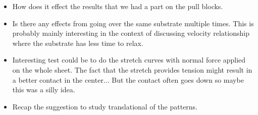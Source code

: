\begin{itemize}
  \item How does it effect the results that we had a part on the pull blocks. 
  \item Is there any effects from going over the same substrate multiple times. This is probably mainly interesting in the context of discussing velocity relationship where the substrate has less time to relax.
  \item Interesting test could be to do the stretch curves with normal force applied on the whole sheet. The fact that the stretch provides tension might result in a better contact in the center... But the contact often goes down so maybe this was a silly idea.
  \item Recap the suggestion to study translational of the patterns.
\end{itemize}



